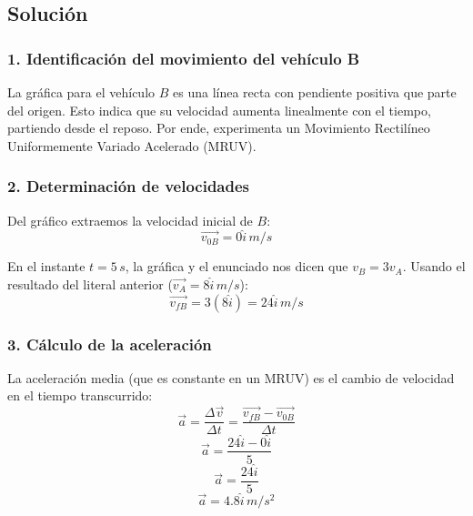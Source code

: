 \documentclass[12pt, a4paper]{article}
\begin{document}
\begin{center}
\end{center}

\subsection*{Solución}

\subsubsection*{1. Identificación del movimiento del vehículo B}
La gráfica para el vehículo $B$ es una línea recta con pendiente positiva que parte del origen. Esto indica que su velocidad aumenta linealmente con el tiempo, partiendo desde el reposo. Por ende, experimenta un Movimiento Rectilíneo Uniformemente Variado Acelerado (MRUV).

\subsubsection*{2. Determinación de velocidades}
Del gráfico extraemos la velocidad inicial de $B$:
$$ \vec{v_{0B}} = 0\hat{i} \, \si{m/s} $$

En el instante $t = 5 \, \si{s}$, la gráfica y el enunciado nos dicen que $v_B = 3v_A$. Usando el resultado del literal anterior ($\vec{v_A} = 8\hat{i} \, \si{m/s}$):
$$ \vec{v_{fB}} = 3(8\hat{i}) = 24\hat{i} \, \si{m/s} $$

\subsubsection*{3. Cálculo de la aceleración}
La aceleración media (que es constante en un MRUV) es el cambio de velocidad en el tiempo transcurrido:
$$ \vec{a} = \frac{\Delta \vec{v}}{\Delta t} = \frac{\vec{v_{fB}} - \vec{v_{0B}}}{\Delta t} $$
$$ \vec{a} = \frac{24\hat{i} - 0\hat{i}}{5} $$
$$ \vec{a} = \frac{24\hat{i}}{5} $$
$$ \vec{a} = 4.8\hat{i} \, \si{m/s^2} $$
\end{document}
